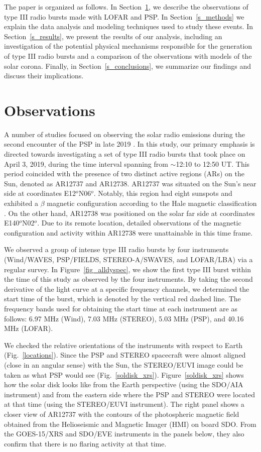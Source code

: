 The paper is organized as follows. In Section~\ref{s_obs}, we describe the observations of type III radio bursts made with LOFAR and PSP. In Section~\ref{s_methods} we explain the data analysis and modeling techniques used to study these events. In Section~\ref{s_results}, we present the results of our analysis, including an investigation of the potential physical mechanisms responsible for the generation of type III radio bursts and a comparison of the observations with models of the solar corona. Finally, in Section~\ref{s_conclusions}, we summarize our findings and discuss their implications.

\section{Observations}
\label{s_obs}
A number of studies focused on observing the solar radio emissions during the second encounter of the PSP in late 2019 \citep{Krupar_2020, pulupa20, Cattell_2021, harra2021active, badman22}. In this study, our primary emphasis is directed towards investigating a set of type III radio bursts that took place on April 3, 2019, during the time interval spanning from $\sim$12:10 to 12:50 UT. This period coincided with the presence of two distinct active regions (ARs) on the Sun, denoted as AR12737 and AR12738. 
AR12737 was situated on the Sun's near side at coordinates E12$^o$N06$^o$. Notably, this region had eight sunspots and exhibited a $\beta$ magnetic configuration according to the Hale magnetic classification \citep{hale_1919}. On the other hand, AR12738 was positioned on the solar far side at coordinates E140$^o$N02$^o$. Due to its remote location, detailed observations of the magnetic configuration and activity within AR12738 were unattainable in this time frame.

We observed a group of intense type III radio bursts by four instruments (Wind/WAVES, PSP/FIELDS, STEREO-A/SWAVES, and LOFAR/LBA) via a regular survey. In Figure~\ref{fig_alldyspec}, we show the first type III burst within the time of this study as observed by the four instruments. By taking the second derivative of the light curve at a specific frequency channels, we determined the start time of the burst, which is denoted by the vertical red dashed line. The frequency bands used for obtaining the start time at each instrument are as follows: 6.97 MHz (Wind), 7.03 MHz (STEREO), 5.03 MHz (PSP), and 40.16 MHz (LOFAR).

We checked the relative orientations of the instruments with respect to Earth (Fig.~\ref{locations}). Since the PSP and STEREO spacecraft were almost aligned (close in an angular sense) with the Sun, the STEREO/EUVI image could be taken as what PSP would see (Fig.~\ref{soldisk_xrs}).
Figure~\ref{soldisk_xrs} shows how the solar disk looks like from the Earth perspective (using the SDO/AIA instrument) and from the eastern side where the PSP and STEREO were located at that time (using the STEREO/EUVI instrument).
The right panel shows a closer view of AR12737 with the contours of the photospheric magnetic field obtained from the Helioseismic and Magnetic Imager (HMI) on board SDO.
From the GOES-15/XRS and SDO/EVE instruments in the panels below, they also confirm that there is no flaring activity at that time.


